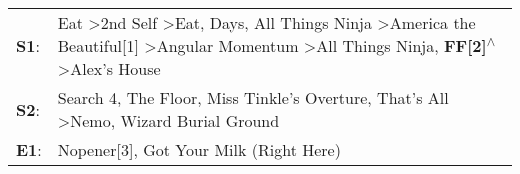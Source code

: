 \begin{supertabular}{p{0.03\textwidth}p{0.92\textwidth}}
 \textbf{S1}:  &  Eat\textsuperscript{} \textgreater \enspace 2nd Self\textsuperscript{} \textgreater \enspace Eat\textsuperscript{},  Days\textsuperscript{}, \enspace All Things Ninja\textsuperscript{} \textgreater \enspace America the Beautiful[1]\textsuperscript{} \textgreater \enspace Angular Momentum\textsuperscript{} \textgreater \enspace All Things Ninja\textsuperscript{}, \enspace \textbf{FF[2]\textsuperscript{$\wedge$}} \textgreater \enspace Alex's House\textsuperscript{}  \enspace  \\
 \textbf{S2}:  &                                                                                                                                                                                                                                        Search 4\textsuperscript{}, \enspace The Floor\textsuperscript{}, \enspace Miss Tinkle's Overture\textsuperscript{}, \enspace That's All\textsuperscript{} \textgreater \enspace Nemo\textsuperscript{}, \enspace Wizard Burial Ground\textsuperscript{}  \enspace  \\
 \textbf{E1}:  &                                                                                                                                                                                                                                                                                                                                                                                                             Nopener[3]\textsuperscript{}, \enspace Got Your Milk (Right Here)\textsuperscript{}  \enspace  \\
\end{supertabular}
